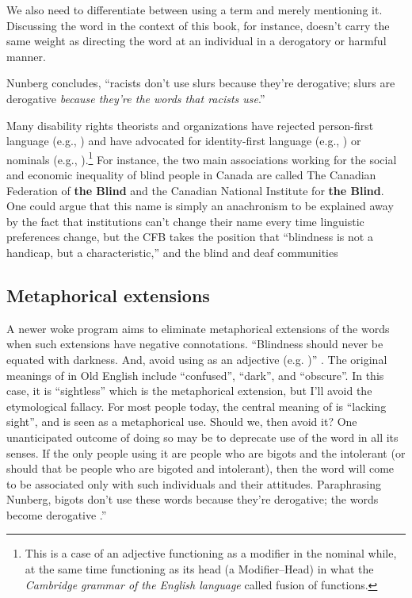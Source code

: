 We also need to differentiate between using a term and merely mentioning it. Discussing the word  in the context of this book, for instance, doesn't carry the same weight as directing the word at an individual in a derogatory or harmful manner.




Nunberg concludes, ``racists don't use slurs because they're derogative; slurs are derogative \textit{because they're the words that racists use}.'' \citep[244]{Nunberg2018}

Many disability rights theorists and organizations have rejected person-first language (e.g., ) and have advocated for identity-first language (e.g., ) or nominals (e.g., ).\footnote{This is a case of an adjective functioning as a modifier in the nominal while, at the same time functioning as its head (a Modifier--Head) in what the \textit{Cambridge grammar of the English language} called fusion of functions.} For instance, the two main associations working for the social and economic inequality of blind people in Canada are called The Canadian Federation of \textbf{the Blind} and the Canadian National Institute for \textbf{the Blind}. One could argue that this name is simply an anachronism to be explained away by the fact that institutions can't change their name every time linguistic preferences change, but the CFB takes the position that ``blindness is not a handicap, but a characteristic,'' and the blind and deaf communities

\subsection{Metaphorical extensions}
A newer woke program aims to eliminate metaphorical extensions of the words when such extensions have negative connotations. ``Blindness should never be equated with darkness. And, avoid using  as an adjective (e.g. )'' \citep[8]{Jones2017}. The original meanings of  in Old English include ``confused'', ``dark'', and ``obscure''. In this case, it is ``sightless'' which is the metaphorical extension, but I'll avoid the etymological fallacy. For most people today, the central meaning of  is ``lacking sight'', and  is seen as a metaphorical use. Should we, then avoid it? One unanticipated outcome of doing so may be to deprecate use of the word in all its senses. If the only people using it are people who are bigots and the intolerant (or should that be people who are bigoted and intolerant), then the word will come to be associated only with such individuals and their attitudes. Paraphrasing Nunberg, bigots don't use these words because they're derogative; the words become derogative .''


